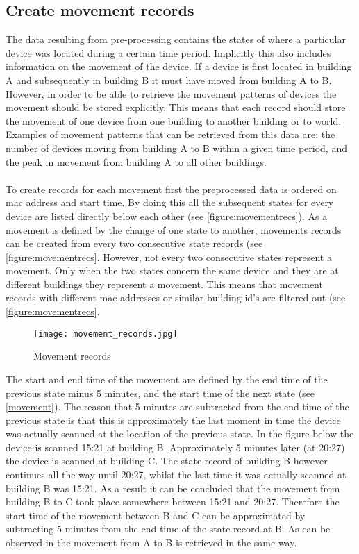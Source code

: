 \subsection{Create movement records}

The data resulting from pre-processing contains the states of where a particular device was located during a certain time period. Implicitly this also includes information on the movement of the device. If a device is first located in building A and subsequently in building B it must have moved from building A to B. However, in order to be able to retrieve the movement patterns of devices the movement should be stored explicitly. This means that each record should store the movement of one device from one building to another building or to world. Examples of movement patterns that can be retrieved from this data are: the number of devices moving from building A to B within a given time period, and the peak in movement from building A to all other buildings. 
\\\\
To create records for each movement first the preprocessed data is ordered on mac address and start time. By doing this all the subsequent states for every device are listed directly below each other (see \autoref{figure:movementrecs}). As a movement is defined by the change of one state to another, movements records can be created from every two consecutive state records (see \autoref{figure:movementrecs}. However, not every two consecutive states represent a movement. Only when the two states concern the same device and they are at different buildings they represent a movement. This means that movement records with different mac addresses or similar building id’s are filtered out (see \autoref{figure:movementrecs}.\\

\begin{figure}[H]
\centering
\texttt{[image: movement\_records.jpg]}
\captionsetup{justification=centering}
\caption{Movement records}
\label{figure:movementrecs}
\end{figure}

The start and end time of the movement are defined by the end time of the previous state minus 5 minutes, and the start time of the next state (see \autoref{movement}). The reason that 5 minutes are subtracted from the end time of the previous state is that this is approximately the last moment in time the device was actually scanned at the location of the previous state. In the figure below the device is scanned 15:21 at building B. Approximately 5 minutes later (at 20:27) the device is scanned at building C. The state record of building B however continues all the way until 20:27, whilst the last time it was actually scanned at building B was 15:21. As a result it can be concluded that the movement from building B to C took place somewhere between 15:21 and 20:27. Therefore the start time of the movement between B and C can be approximated by subtracting 5 minutes from the end time of the state record at B. As can be observed in the movement from A to B is retrieved in the same way.


